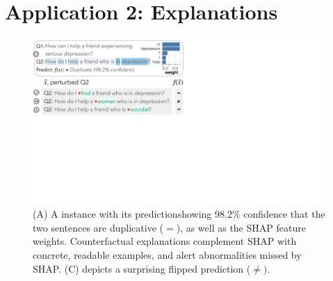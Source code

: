 
\newcommand{\fwone}[1]{\colbox{cfwone}{#1}\xspace}
\newcommand{\fwtwo}[1]{\colbox{cfwtwo}{#1}\xspace}
\newcommand{\fwthree}[1]{\colbox{cfwthree}{#1}\xspace}
\newcommand{\fwfour}[1]{\colbox{cfwfour}{#1}\xspace}

\newcommand{\fexp}[2]{\texttt{[{\color{darkgray}{#1:#2}}]}\xspace}
\newcommand{\fexptag}[1]{\fexp{TAG}{#1}}
\newcommand{\fexpfrom}[1]{\fexp{FROM}{#1}}
\newcommand{\fexpto}[1]{\fexp{TO}{#1}}
\newcommand{\fexptemp}[1]{\fexp{TEMP}{#1}}


\section{Application 2: Explanations}
\label{sec:app_explain}




\begin{figure}[t]
\centering
\includegraphics[trim={0 21cm 33cm 0cm},clip,width=1\columnwidth]{figures/explanation_v2.pdf}
\vspace{-15pt}
\caption{
(A) A \qqp instance with its prediction\footnotemark showing 98.2\% confidence that the two sentences are duplicative ($=$), as well as the SHAP feature weights.
Counterfactual explanations complement SHAP with concrete, readable examples, and alert abnormalities missed by SHAP. \eg (C)
depicts a surprising flipped prediction ($\neq)$.
}
\vspace{-10pt}
\label{fig:explanation}
\end{figure}

